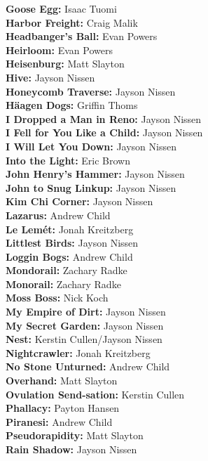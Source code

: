 \begin{flushleft}
\textbf{Goose Egg:} Isaac Tuomi\\
\textbf{Harbor Freight:} Craig Malik\\
\textbf{Headbanger's Ball:} Evan Powers\\
\textbf{Heirloom:} Evan Powers\\
\textbf{Heisenburg:} Matt Slayton\\
\textbf{Hive:} Jayson Nissen\\
\textbf{Honeycomb Traverse:} Jayson Nissen\\
\textbf{Häagen Dogs:} Griffin Thoms\\
\textbf{I Dropped a Man in Reno:} Jayson Nissen\\
\textbf{I Fell for You Like a Child:} Jayson Nissen\\
\textbf{I Will Let You Down:} Jayson Nissen\\
\textbf{Into the Light:} Eric Brown\\
\textbf{John Henry's Hammer:} Jayson Nissen\\
\textbf{John to Snug Linkup:} Jayson Nissen\\
\textbf{Kim Chi Corner:} Jayson Nissen\\
\textbf{Lazarus:} Andrew Child\\
\textbf{Le Lemét:} Jonah Kreitzberg\\
\textbf{Littlest Birds:} Jayson Nissen\\
\textbf{Loggin Bogs:} Andrew Child\\
\textbf{Mondorail:} Zachary Radke\\
\textbf{Monorail:} Zachary Radke\\
\textbf{Moss Boss:} Nick Koch\\
\textbf{My Empire of Dirt:} Jayson Nissen\\
\textbf{My Secret Garden:} Jayson Nissen\\
\textbf{Nest:} Kerstin Cullen/Jayson Nissen\\
\textbf{Nightcrawler:} Jonah Kreitzberg\\
\textbf{No Stone Unturned:} Andrew Child\\
\textbf{Overhand:} Matt Slayton\\
\textbf{Ovulation Send-sation:} Kerstin Cullen\\
\textbf{Phallacy:} Payton Hansen\\
\textbf{Piranesi:} Andrew Child\\
\textbf{Pseudorapidity:} Matt Slayton\\
\textbf{Rain Shadow:} Jayson Nissen\\

\end{flushleft}
